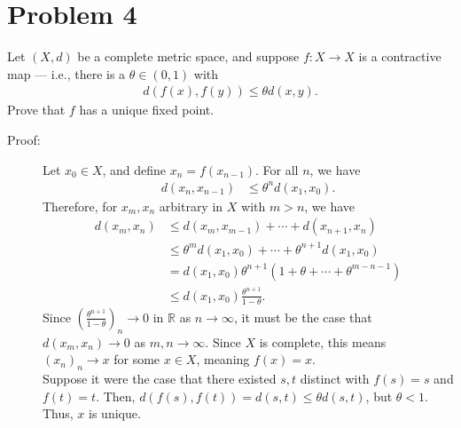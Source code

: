\documentclass[8pt]{extarticle}
\newcommand{\R}{\mathbb{R}}
\begin{document}
  \section{Problem 4}%
  Let $(X,d)$ be a complete metric space, and suppose $f: X\rightarrow X$ is a contractive map --- i.e., there is a $\theta \in (0,1)$ with
  \begin{align*}
    d(f(x),f(y)) \leq \theta d(x,y).
  \end{align*}
  Prove that $f$ has a unique fixed point.
  \begin{description}
    \item[Proof:] Let $x_0\in X$, and define $x_{n} = f(x_{n-1})$. For all $n$, we have
      \begin{align*}
        d(x_{n},x_{n-1}) &\leq \theta^{n}d(x_1,x_0).
      \end{align*}
      Therefore, for $x_m,x_n$ arbitrary in $X$ with $m > n$, we have
      \begin{align*}
        d(x_m,x_n) &\leq d(x_m,x_{m-1}) + \cdots + d(x_{n+1},x_n)\\
                   &\leq \theta^{m}d(x_1,x_0) + \cdots + \theta^{n+1}d(x_1,x_0)\\
                   &= d(x_1,x_0) \theta^{n+1}\left(1 + \theta + \cdots + \theta^{m-n-1}\right)\\
                   &\leq d(x_1,x_0)\frac{\theta^{n+1}}{1-\theta}.
      \end{align*}
      Since $\left(\frac{\theta^{n+1}}{1-\theta}\right)_n\rightarrow 0$ in $\R$ as $n\rightarrow\infty$, it must be the case that $d(x_m,x_n)\rightarrow 0$ as $m,n\rightarrow \infty$. Since $X$ is complete, this means $(x_n)_n\rightarrow x$ for some $x\in X$, meaning $f(x) = x$.\\

      Suppose it were the case that there existed $s,t$ distinct with $f(s) = s$ and $f(t) = t$. Then, $d(f(s),f(t)) = d(s,t) \leq \theta d(s,t)$, but $\theta < 1$. Thus, $x$ is unique.
  \end{description}
\end{document}
